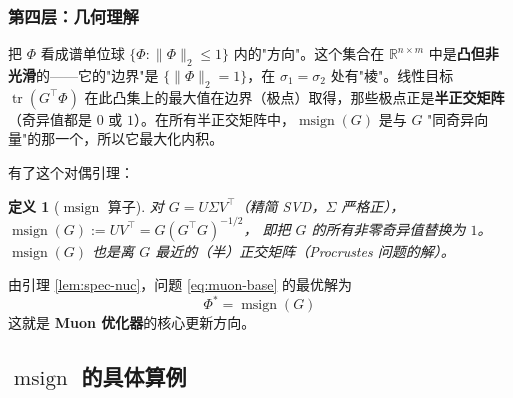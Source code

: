 \documentclass[11pt,a4paper]{article}
\theoremstyle{mythm}
\theoremstyle{mydef}
\newtheorem{definition}[theorem]{定义}
\newcommand{\R}{\mathbb{R}}
\newcommand{\tr}{\operatorname{tr}}
\newcommand{\msign}{\operatorname{msign}}
\begin{document}
\subsubsection*{第四层：几何理解}

把 $\Phi$ 看成谱单位球 $\{\Phi: \|\Phi\|_2 \le 1\}$ 内的"方向"。这个集合在 $\R^{n\times m}$ 中是\textbf{凸但非光滑}的——它的"边界"是 $\{\|\Phi\|_2 = 1\}$，在 $\sigma_1 = \sigma_2$ 处有"棱"。线性目标 $\tr(G^\top \Phi)$ 在此凸集上的最大值在边界（极点）取得，那些极点正是\textbf{半正交矩阵}（奇异值都是 $0$ 或 $1$）。在所有半正交矩阵中，$\msign(G)$ 是与 $G$ "同奇异向量"的那一个，所以它最大化内积。

\medskip
有了这个对偶引理：

\begin{definition}[$\msign$ 算子]
对 $G = U\Sigma V^\top$（精简 SVD，$\Sigma$ 严格正），
$\msign(G) := UV^\top = G(G^\top G)^{-1/2}$，
即把 $G$ 的所有非零奇异值替换为 $1$。$\msign(G)$ 也是\emph{离 $G$ 最近的（半）正交矩阵}（Procrustes 问题的解）。
\end{definition}

由引理 \ref{lem:spec-nuc}，问题 \eqref{eq:muon-base} 的最优解为
\begin{equation}\label{eq:muon-sol}
\boxed{\quad\Phi^\ast = \msign(G)\quad}
\end{equation}
这就是 \textbf{Muon 优化器}的核心更新方向。

\subsection{$\msign$ 的具体算例}
\end{document}
